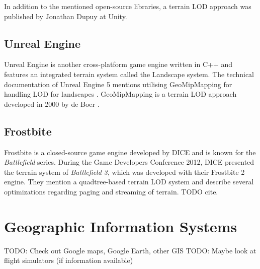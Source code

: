 In addition to the mentioned open-source libraries, a terrain LOD approach was published by Jonathan Dupuy at Unity.

\subsection{Unreal Engine}
Unreal Engine is another cross-platform game engine written in C++ and features
an integrated terrain system called the Landscape system.
The technical documentation of Unreal Engine 5 mentions utilising GeoMipMapping for 
handling LOD for landscapes \cite{unrealengine5doc}. GeoMipMapping is a terrain LOD approach developed 
in 2000 by de Boer \cite{geomipmapping}. %

\subsection{Frostbite}
Frostbite is a closed-source game engine developed by DICE and is known for the \textit{Battlefield} series.
During the Game Developers Conference 2012, DICE presented the terrain system of \textit{Battlefield 3}, which was developed with their Frostbite 2 engine.
They mention a quadtree-based terrain LOD system and describe several optimizations regarding paging and streaming of terrain.
TODO cite.

\section{Geographic Information Systems}
TODO: Check out Google maps, Google Earth, other GIS
TODO: Maybe look at flight simulators (if information available)

